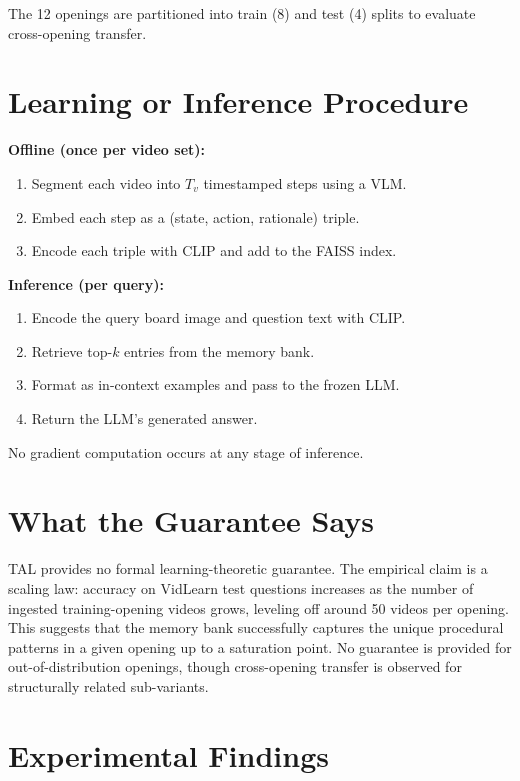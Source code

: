 \documentclass[10pt,twocolumn]{article}
\begin{document}
The 12 openings are partitioned into train (8) and test (4) splits to
evaluate cross-opening transfer.

\section{Learning or Inference Procedure}

\textbf{Offline (once per video set):}
\begin{enumerate}[itemsep=2pt,parsep=0pt]
  \item Segment each video into $T_v$ timestamped steps using a VLM.
  \item Embed each step as a (state, action, rationale) triple.
  \item Encode each triple with CLIP and add to the FAISS index.
\end{enumerate}

\textbf{Inference (per query):}
\begin{enumerate}[itemsep=2pt,parsep=0pt]
  \item Encode the query board image and question text with CLIP.
  \item Retrieve top-$k$ entries from the memory bank.
  \item Format as in-context examples and pass to the frozen LLM.
  \item Return the LLM's generated answer.
\end{enumerate}

No gradient computation occurs at any stage of inference.

\section{What the Guarantee Says}

TAL provides no formal learning-theoretic guarantee. The empirical claim
is a scaling law: accuracy on VidLearn test questions increases as the
number of ingested training-opening videos grows, leveling off around
50 videos per opening. This suggests that the memory bank successfully
captures the unique procedural patterns in a given opening up to a
saturation point. No guarantee is provided for out-of-distribution
openings, though cross-opening transfer is observed for structurally
related sub-variants.

\section{Experimental Findings}
\end{document}
